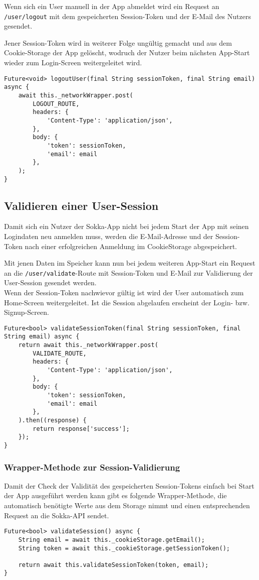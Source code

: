 Wenn sich ein User manuell in der App abmeldet wird ein Request an \lstinline{/user/logout} mit
dem gespeicherten Session-Token und der E-Mail des Nutzers gesendet.

Jener Session-Token wird in weiterer Folge ungültig gemacht und aus dem Cookie-Storage der App
gelöscht, wodruch der Nutzer beim nächsten App-Start wieder zum Login-Screen weitergeleitet wird.

\begin{lstlisting}
Future<void> logoutUser(final String sessionToken, final String email) async {
    await this._networkWrapper.post(
        LOGOUT_ROUTE,
        headers: {
            'Content-Type': 'application/json',
        },
        body: {
            'token': sessionToken,
            'email': email
        },
    );
}
\end{lstlisting}

\subsection{Validieren einer User-Session}

Damit sich ein Nutzer der Sokka-App nicht bei jedem Start der App mit seinen Logindaten neu
anmelden muss, werden die E-Mail-Adresse und der Session-Token nach einer erfolgreichen Anmeldung
im CookieStorage abgespeichert.

Mit jenen Daten im Speicher kann nun bei jedem weiteren App-Start ein Request an die
\lstinline{/user/validate}-Route mit Session-Token und E-Mail zur Validierung der User-Session
gesendet werden.\\
Wenn der Session-Token nachwievor gültig ist wird der User automatisch zum Home-Screen weitergeleitet.
Ist die Session abgelaufen erscheint der Login- bzw. Signup-Screen.

\begin{lstlisting}
Future<bool> validateSessionToken(final String sessionToken, final String email) async {
    return await this._networkWrapper.post(
        VALIDATE_ROUTE,
        headers: {
            'Content-Type': 'application/json',
        },
        body: {
            'token': sessionToken,
            'email': email
        },
    ).then((response) {
        return response['success'];
    });
}
\end{lstlisting}

\subsubsection{Wrapper-Methode zur Session-Validierung}

Damit der Check der Validität des gespeicherten Session-Tokens einfach
bei Start der App ausgeführt werden kann gibt es folgende Wrapper-Methode,
die automatisch benötigte Werte aus dem Storage nimmt und einen entsprechenden
Request an die Sokka-API sendet.

\begin{lstlisting}
Future<bool> validateSession() async {
    String email = await this._cookieStorage.getEmail();
    String token = await this._cookieStorage.getSessionToken();

    return await this.validateSessionToken(token, email);
}
\end{lstlisting}